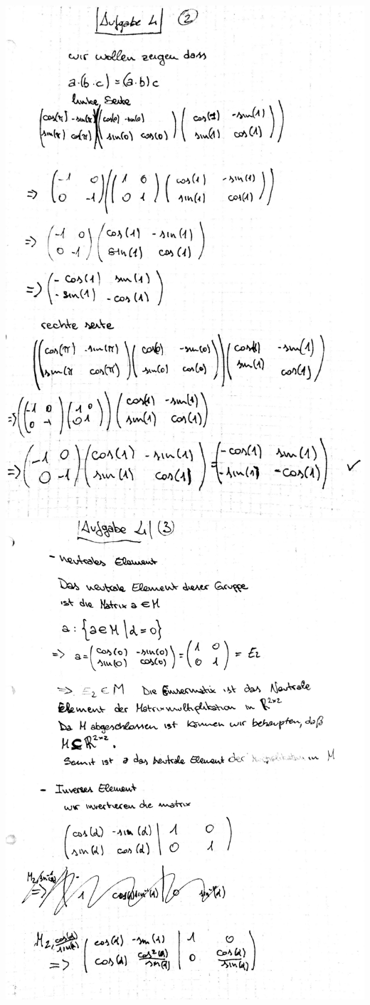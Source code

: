 \documentclass[12pt,a4paper]{article}
\begin{document}
\includegraphics[scale=0.2]{lat4e_2.jpg} 
\newpage
\includegraphics[scale=0.2]{lat4e_3.jpg} 
\end{document}

